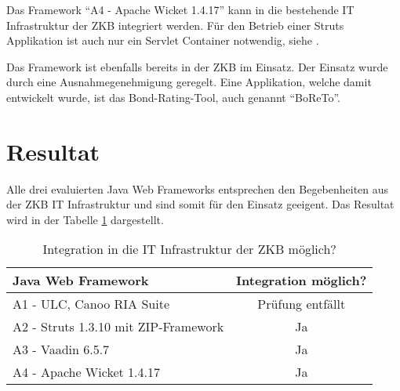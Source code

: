 Das Framework ``A4 - Apache Wicket 1.4.17'' kann in die bestehende IT
Infrastruktur der \ac{ZKB} integriert werden. Für den Betrieb einer Struts
Applikation ist auch nur ein Servlet Container notwendig, siehe
\cite{WicketDokumentation}.

Das Framework ist ebenfalls bereits in der \ac{ZKB} im Einsatz. Der Einsatz
wurde durch eine Ausnahmegenehmigung geregelt. Eine Applikation, welche damit
entwickelt wurde, ist das Bond-Rating-Tool, auch genannt ``BoReTo''.

\section{Resultat}

Alle drei evaluierten Java Web Frameworks entsprechen den Begebenheiten aus der
\ac{ZKB} IT Infrastruktur und sind somit für den Einsatz geeigent. Das Resultat
wird in der Tabelle \ref{tab:integrationMoeglich} dargestellt.
\newline

\begin{table}[!h]
  \sffamily 
  \begin{center}
    \begin{tabular}{lc}
      \toprule
      Java Web Framework & Integration möglich?\\
      \midrule
      A1 - ULC, Canoo RIA Suite & Prüfung entfällt\\
      A2 - Struts 1.3.10 mit ZIP-Framework & Ja\\
      A3 - Vaadin 6.5.7 & Ja\\
      A4 - Apache Wicket 1.4.17 & Ja\\
      \bottomrule
    \end{tabular}
    \caption{Integration in die IT Infrastruktur der \ac{ZKB} möglich?}
    \label{tab:integrationMoeglich}
  \end{center}
\end{table}